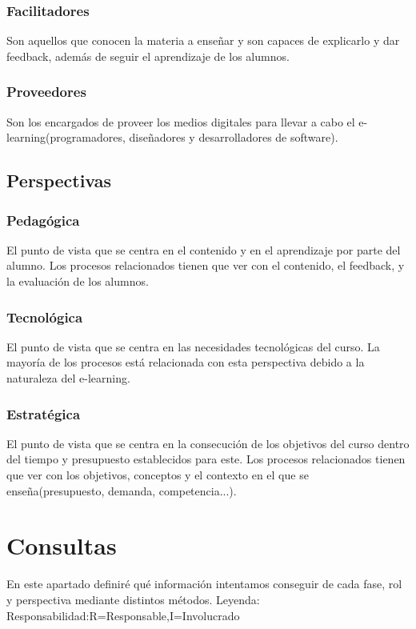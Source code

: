 \subsubsection{Facilitadores}
Son aquellos que conocen la materia a enseñar y son capaces de explicarlo y dar feedback, además de seguir el aprendizaje de los alumnos.

\subsubsection{Proveedores}
Son los encargados de proveer los medios digitales para llevar a cabo el e-learning(programadores, diseñadores y desarrolladores de software).

\subsection{Perspectivas}

\subsubsection{Pedagógica}
El punto de vista que se centra en el contenido y en el aprendizaje por parte del alumno. Los procesos relacionados tienen que ver con el contenido, el feedback, y la evaluación de los alumnos.

\subsubsection{Tecnológica}
El punto de vista que se centra en las necesidades tecnológicas del curso. La mayoría de los procesos está relacionada con esta perspectiva debido a la naturaleza del e-learning.

\subsubsection{Estratégica}
El punto de vista que se centra en la consecución de los objetivos del curso dentro del tiempo y presupuesto establecidos para este. Los procesos relacionados tienen que ver con los objetivos, conceptos y el contexto en el que se enseña(presupuesto, demanda, competencia...).


\section{Consultas}
En este apartado definiré qué información intentamos conseguir de cada fase, rol y perspectiva mediante distintos métodos.
Leyenda:
Responsabilidad:R=Responsable,I=Involucrado


